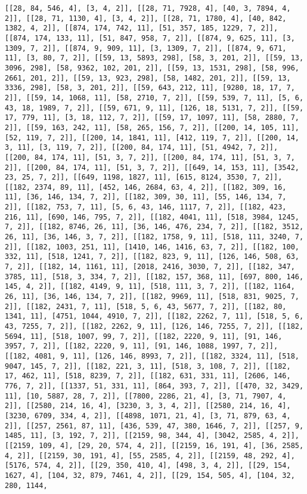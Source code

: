 \documentclass[12pt,fleqn]{article}\usepackage{../../common}
\begin{document}
\begin{verbatim}
[[28, 84, 546, 4], [3, 4, 2]], [[28, 71, 7928, 4], [40, 3, 7894, 4, 2]], [[28, 71, 1130, 4], [3, 4, 2]], [[28, 71, 1780, 4], [40, 842, 1382, 4, 2]], [[874, 174, 742, 11], [51, 357, 185, 1229, 7, 2]], [[874, 174, 133, 11], [51, 847, 958, 7, 2]], [[874, 9, 625, 11], [3, 1309, 7, 2]], [[874, 9, 909, 11], [3, 1309, 7, 2]], [[874, 9, 671, 11], [3, 80, 7, 2]], [[59, 13, 5893, 298], [58, 3, 201, 2]], [[59, 13, 3096, 298], [58, 9362, 102, 201, 2]], [[59, 13, 1531, 298], [58, 996, 2661, 201, 2]], [[59, 13, 923, 298], [58, 1482, 201, 2]], [[59, 13, 3336, 298], [58, 3, 201, 2]], [[59, 643, 212, 11], [9280, 18, 17, 7, 2]], [[59, 14, 1068, 11], [58, 2710, 7, 2]], [[59, 539, 7, 11], [5, 6, 43, 18, 1989, 7, 2]], [[59, 671, 9, 11], [126, 18, 5131, 7, 2]], [[59, 17, 779, 11], [3, 18, 112, 7, 2]], [[59, 17, 1097, 11], [58, 2880, 7, 2]], [[59, 163, 242, 11], [58, 265, 156, 7, 2]], [[200, 14, 105, 11], [52, 119, 7, 2]], [[200, 14, 1841, 11], [412, 119, 7, 2]], [[200, 14, 3, 11], [3, 119, 7, 2]], [[200, 84, 174, 11], [51, 4942, 7, 2]], [[200, 84, 174, 11], [51, 3, 7, 2]], [[200, 84, 174, 11], [51, 3, 7, 2]], [[200, 84, 174, 11], [51, 3, 7, 2]], [[649, 14, 153, 11], [3542, 23, 25, 7, 2]], [[649, 1198, 1827, 11], [615, 8124, 3530, 7, 2]], [[182, 2374, 89, 11], [452, 146, 2684, 63, 4, 2]], [[182, 309, 16, 11], [36, 146, 134, 7, 2]], [[182, 309, 30, 11], [55, 146, 134, 7, 2]], [[182, 753, 7, 11], [5, 6, 43, 146, 1117, 7, 2]], [[182, 423, 216, 11], [690, 146, 795, 7, 2]], [[182, 4041, 11], [518, 3984, 1245, 7, 2]], [[182, 8746, 26, 11], [36, 146, 476, 234, 7, 2]], [[182, 3512, 26, 11], [36, 146, 3, 7, 2]], [[182, 1758, 9, 11], [518, 111, 3240, 7, 2]], [[182, 1003, 251, 11], [1410, 146, 1416, 63, 7, 2]], [[182, 100, 332, 11], [518, 1241, 7, 2]], [[182, 823, 9, 11], [126, 146, 508, 63, 7, 2]], [[182, 14, 1161, 11], [2018, 2416, 3030, 7, 2]], [[182, 347, 3785, 11], [518, 3, 334, 7, 2]], [[182, 157, 368, 11], [697, 800, 146, 145, 4, 2]], [[182, 4149, 9, 11], [518, 111, 3, 7, 2]], [[182, 1164, 26, 11], [36, 146, 134, 7, 2]], [[182, 9969, 11], [518, 831, 9025, 7, 2]], [[182, 2431, 7, 11], [518, 5, 6, 43, 5677, 7, 2]], [[182, 80, 1341, 11], [4751, 1044, 4910, 7, 2]], [[182, 2262, 7, 11], [518, 5, 6, 43, 7255, 7, 2]], [[182, 2262, 9, 11], [126, 146, 7255, 7, 2]], [[182, 5694, 11], [518, 1007, 99, 7, 2]], [[182, 2220, 9, 11], [91, 146, 3957, 7, 2]], [[182, 2220, 9, 11], [91, 146, 1088, 1997, 7, 2]], [[182, 4081, 9, 11], [126, 146, 8993, 7, 2]], [[182, 3324, 11], [518, 9047, 145, 7, 2]], [[182, 221, 3, 11], [518, 3, 108, 7, 2]], [[182, 17, 462, 11], [518, 8239, 7, 2]], [[182, 631, 331, 11], [2606, 146, 776, 7, 2]], [[1337, 51, 331, 11], [864, 393, 7, 2]], [[470, 32, 3429, 11], [10, 5887, 28, 7, 2]], [[7800, 2286, 21, 4], [3, 71, 7907, 4, 2]], [[2580, 214, 16, 4], [3230, 3, 3, 4, 2]], [[2580, 214, 16, 4], [3230, 6709, 334, 4, 2]], [[4898, 1071, 21, 4], [3, 71, 879, 63, 4, 2]], [[257, 2561, 87, 11], [436, 539, 47, 380, 1646, 7, 2]], [[257, 9, 1485, 11], [3, 192, 7, 2]], [[2159, 98, 344, 4], [3042, 2585, 4, 2]], [[2159, 109, 4], [29, 20, 574, 4, 2]], [[2159, 16, 191, 4], [36, 2585, 4, 2]], [[2159, 30, 191, 4], [55, 2585, 4, 2]], [[2159, 48, 292, 4], [5176, 574, 4, 2]], [[29, 350, 410, 4], [498, 3, 4, 2]], [[29, 154, 1627, 4], [104, 32, 879, 7461, 4, 2]], [[29, 154, 505, 4], [104, 32, 280, 1144, 
\end{verbatim}
\end{document}
